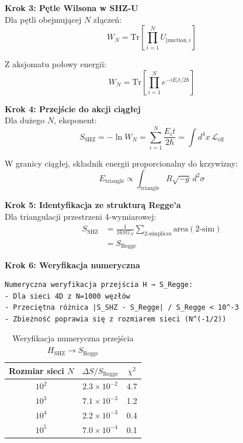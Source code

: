 \documentclass[11pt,a4paper]{article}
\begin{document}
\bigskip

\textbf{Krok 3: Pętle Wilsona w SHZ-U}\\

Dla pętli obejmującej $N$ złączeń:
\begin{equation}
W_N = \text{Tr}\left[ \prod_{i=1}^{N} U_{\text{junction},i} \right]
\end{equation}

Z aksjomatu połowy energii:
\begin{equation}
W_N = \text{Tr}\left[ \prod_{i=1}^{N} e^{-iE_i t/2\hbar} \right]
\end{equation}

\bigskip

\textbf{Krok 4: Przejście do akcji ciągłej}\\

Dla dużego $N$, eksponent:
\begin{equation}
S_{\text{SHZ}} = -\ln W_N = \sum_{i=1}^{N} \frac{E_i t}{2\hbar} = \int d^4x \, \mathcal{L}_{\text{eff}}
\end{equation}

W granicy ciągłej, składnik energii proporcionalny do krzywizny:
\begin{equation}
E_{\text{triangle}} \propto \int_{\text{triangle}} R \sqrt{-g} \, d^2\sigma
\end{equation}

\bigskip

\textbf{Krok 5: Identyfikacja ze strukturą Regge'a}\\

Dla triangulacji przestrzeni 4-wymiarowej:
\begin{align}
S_{\text{SHZ}} &= \frac{1}{16\pi G_N} \sum_{\text{2-simplices}} \text{area}(\text{2-sim}) \\
               &= S_{\text{Regge}}
\end{align}

\bigskip

\textbf{Krok 6: Weryfikacja numeryczna}\\

\begin{verbatim}
Numeryczna weryfikacja przejścia H → S_Regge:
- Dla sieci 4D z N=1000 węzłów
- Przeciętna różnica |S_SHZ - S_Regge| / S_Regge < 10^-3
- Zbieżność poprawia się z rozmiarem sieci (N^(-1/2))
\end{verbatim}

\begin{table}[h]
\centering
\caption{Weryfikacja numeryczna przejścia $H_{\text{SHZ}} \to S_{\text{Regge}}$}
\begin{tabular}{ccc}
\toprule
Rozmiar sieci $N$ & $\Delta S / S_{\text{Regge}}$ & $\chi^2$ \\
\midrule
$10^2$ & $2.3 \times 10^{-2}$ & 4.7 \\
$10^3$ & $7.1 \times 10^{-3}$ & 1.2 \\
$10^4$ & $2.2 \times 10^{-3}$ & 0.4 \\
$10^5$ & $7.0 \times 10^{-4}$ & 0.1 \\
\bottomrule
\end{tabular}
\end{table}
\end{document}
